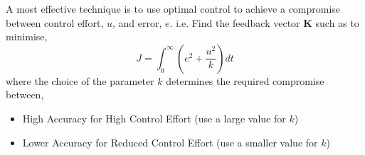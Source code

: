 A most effective technique is to use optimal control to achieve a compromise between control effort, $u$, and error, $e$.
i.e. Find the feedback vector $\mathbf{K}$ such as to minimise,
\[
J=\int_0^{\infty}\left(e^2+\frac{u^2}{k}\right) dt
\]
where the choice of the parameter $k$ determines the required compromise between,
\begin{itemize}
	\item High Accuracy for High Control Effort (use a large value for $k$)
	\item Lower Accuracy for Reduced Control Effort (use a smaller value for $k$)
\end{itemize}

\endinput

